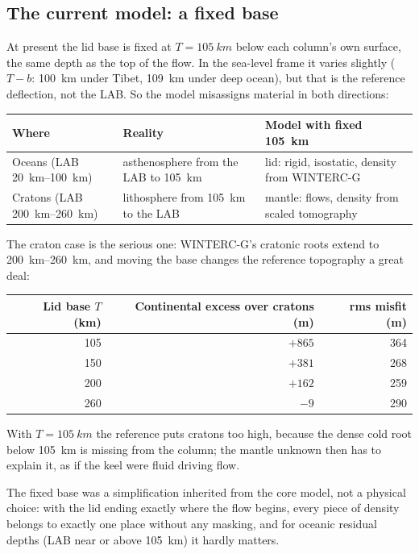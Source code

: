 \subsection{The current model: a fixed base}
At present the lid base is fixed at $T = \qty{105}{km}$ below each column's own surface, the same depth as the top of the flow.
In the sea-level frame it varies slightly ($T - b$: \qty{100}{km} under Tibet, \qty{109}{km} under deep ocean), but that is the reference deflection, not the LAB.
So the model misassigns material in both directions:
\begin{center}
\small
\begin{tabular}{p{}p{}p{}}
\toprule
Where & Reality & Model with fixed \qty{105}{km}\\
\midrule
Oceans (LAB \qtyrange{20}{100}{km}) & asthenosphere from the LAB to \qty{105}{km} & lid: rigid, isostatic, density from WINTERC-G\\
Cratons (LAB \qtyrange{200}{260}{km}) & lithosphere from \qty{105}{km} to the LAB & mantle: flows, density from scaled tomography\\
\bottomrule
\end{tabular}
\end{center}
The craton case is the serious one: WINTERC-G's cratonic roots extend to \qtyrange{200}{260}{km}, and moving the base changes the reference topography a great deal:
\begin{center}
\begin{tabular}{rrr}
\toprule
Lid base $T$ (km) & Continental excess over cratons (m) & rms misfit (m) \\
\midrule
105 & $+865$ & 364 \\
150 & $+381$ & 268 \\
200 & $+162$ & 259 \\
260 & $-9$ & 290 \\
\bottomrule
\end{tabular}
\end{center}
With $T=\qty{105}{km}$ the reference puts cratons too high, because the dense cold root below \qty{105}{km} is missing from the column; the mantle unknown then has to explain it, as if the keel were fluid driving flow.

The fixed base was a simplification inherited from the core model, not a physical choice: with the lid ending exactly where the flow begins, every piece of density belongs to exactly one place without any masking, and for oceanic residual depths (LAB near or above \qty{105}{km}) it hardly matters.

